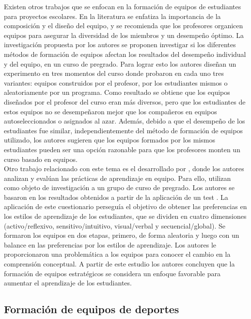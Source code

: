 Existen otros trabajos que se enfocan en la formación de equipos de estudiantes para proyectos escolares. En la literatura se enfatiza la importancia de la composición y el diseño del equipo, y se recomienda que los profesores organicen equipos para asegurar la diversidad de los miembros y un desempeño óptimo. La investigación propuesta por \cite{Pociask2017} los autores se proponen investigar si los diferentes métodos de formación de equipos afectan los resultados del desempeño individual y del equipo, en un curso de pregrado. Para lograr esto los autores diseñan un experimento en tres momentos del curso donde probaron en cada uno tres variantes: equipos construidos por el profesor, por los estudiantes mismos o aleatoriamente por un programa. Como resultado se obtiene que los equipos diseñados por el profesor del curso eran más diversos, pero que los estudiantes de estos equipos no se desempeñaron mejor que los compañeros en equipos autoseleccionados o asignados al azar. Además, debido a que el desempeño de los estudiantes fue similar, independientemente del método de formación de equipos utilizado, los autores sugieren que los equipos formados por los mismos estudiantes pueden ser una opción razonable para que los profesores monten un curso basado en equipos. \\

Otro trabajo relacionado con este tema es el desarrollado por \cite{Kittur2020}, donde los autores analizan y evalúan las prácticas de aprendizaje en equipo. Para ello, utilizan como objeto de investigación a un grupo de curso de pregrado. Los autores se basaron en los resultados obtenidos a partir de la aplicación de un test \cite{Felder}. La aplicación de este cuestionario perseguía el objetivo de obtener las preferencias en los estilos de aprendizaje de los estudiantes, que se dividen en cuatro dimensiones (activo/reflexivo, sensitivo/intuitivo, visual/verbal y secuencial/global). Se formaron los equipos en dos etapas, primero, de forma aleatoria y luego con un balance en las preferencias por los estilos de aprendizaje. Los autores le proporcionaron una problemática a los equipos para conocer el cambio en la comprensión conceptual. A partir de este estudio los autores concluyen que la formación de equipos estratégicos se considera un enfoque favorable para aumentar el aprendizaje de los estudiantes.

\subsection{Formación de equipos de deportes}

